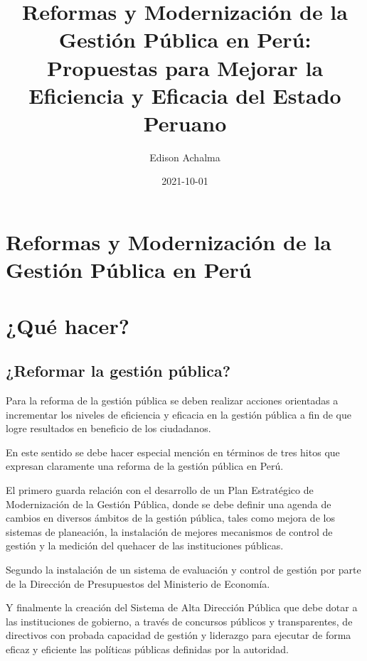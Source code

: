 \documentclass[
  jou,
  floatsintext,
  longtable,
  a4paper,
  nolmodern,
  notxfonts,
  notimes,
  colorlinks=true,linkcolor=blue,citecolor=blue,urlcolor=blue]{apa7}
\title{Reformas y Modernización de la Gestión Pública en Perú:
Propuestas para Mejorar la Eficiencia y Eficacia del Estado Peruano}
\author{Edison Achalma}
\affiliation{
{Escuela Profesional de Economía, Universidad Nacional de San Cristóbal
de Huamanga}}
\date{2021-10-01}
\begin{document}
\maketitle

\hypertarget{toc}{}
\tableofcontents
\newpage
\section[Introduction]{Reformas y Modernización de la Gestión Pública en
Perú}

\setcounter{secnumdepth}{-\maxdimen} %

\setlength\LTleft{0pt}


\section{¿Qué hacer?}\label{quuxe9-hacer}

\subsection{¿Reformar la gestión
pública?}\label{reformar-la-gestiuxf3n-puxfablica}

Para la reforma de la gestión pública se deben realizar acciones
orientadas a incrementar los niveles de eficiencia y eficacia en la
gestión pública a fin de que logre resultados en beneficio de los
ciudadanos.

En este sentido se debe hacer especial mención en términos de tres hitos
que expresan claramente una reforma de la gestión pública en Perú.

El primero guarda relación con el desarrollo de un Plan Estratégico de
Modernización de la Gestión Pública, donde se debe definir una agenda de
cambios en diversos ámbitos de la gestión pública, tales como mejora de
los sistemas de planeación, la instalación de mejores mecanismos de
control de gestión y la medición del quehacer de las instituciones
públicas.

Segundo la instalación de un sistema de evaluación y control de gestión
por parte de la Dirección de Presupuestos del Ministerio de Economía.

Y finalmente la creación del Sistema de Alta Dirección Pública que debe
dotar a las instituciones de gobierno, a través de concursos públicos y
transparentes, de directivos con probada capacidad de gestión y
liderazgo para ejecutar de forma eficaz y eficiente las políticas
públicas definidas por la autoridad.
\end{document}

